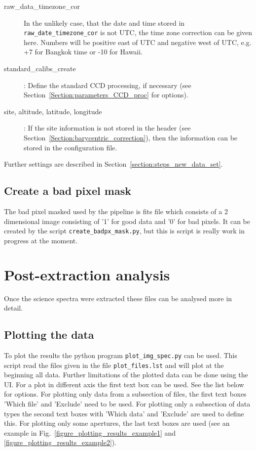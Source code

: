 \documentclass[10pt,a4paper]{article}
\begin{document}
\begin{description}
  \item[raw\_data\_timezone\_cor] In the unlikely case, that the date and time stored in \verb|raw_date_timezone_cor| is not UTC, the time zone correction can be given here. Numbers will be positive east of UTC and negative west of UTC, e.g. +7 for Bangkok time or -10 for Hawaii.
  \item[standard\_calibs\_create] : Define the standard CCD processing, if necessary (see Section~\ref{Section:parameters_CCD_proc} for options).
  \item[site, altitude, latitude, longitude] : If the site information is not stored in the header (see Section~\ref{Section:barycentric_correction}), then the information can be stored in the configuration file.
\end{description}

\noindent Further settings are described in Section~\ref{section:steps_new_data_set}.

\subsection{Create a bad pixel mask}
\noindent The bad pixel masked used by the pipeline is fits file which consists of a 2 dimensional image consisting of '1' for good data and '0' for bad pixels. It can be created by the script \verb|create_badpx_mask.py|, but this is script is really work in progress at the moment.


\newpage
\section{Post-extraction analysis}

\noindent Once the science spectra were extracted these files can be analysed more in detail. 

\subsection{Plotting the data}

To plot the results the python program \verb|plot_img_spec.py| can be used. This script read the files given in the file \verb|plot_files.lst| and will plot at the beginning all data. Further limitations of the plotted data can be done using the UI. For a plot in different axis the first text box can be used. See the list below for options. For plotting only data from a subsection of files, the first text boxes 'Which file' and 'Exclude' need to be used. For plotting only a subsection of data types the second text boxes with 'Which data' and 'Exclude' are used to define this. For plotting only some apertures, the last text boxes are used (see an example in Fig.~\ref{figure_plotting_results_example1} and \ref{figure_plotting_results_example2}).
\end{document}

